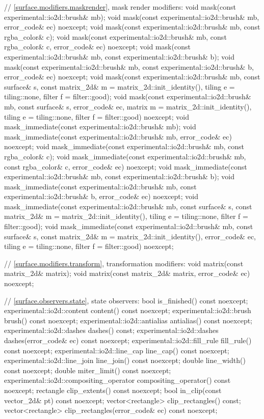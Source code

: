 \begin{codeblock}
{{{{{    // \ref{surface.modifiers.maskrender}, mask render modifiers:
    void mask(const experimental::io2d::brush& mb);
    void mask(const experimental::io2d::brush& mb, error_code& ec)
      noexcept;
    void mask(const experimental::io2d::brush& mb, const rgba_color& c);
    void mask(const experimental::io2d::brush& mb, const rgba_color& c, 
      error_code& ec) noexcept;
    void mask(const experimental::io2d::brush& mb,
      const experimental::io2d::brush& b);
    void mask(const experimental::io2d::brush& mb,
      const experimental::io2d::brush& b, error_code& ec) noexcept;
    void mask(const experimental::io2d::brush& mb, const surface& s,
      const matrix_2d& m = matrix_2d::init_identity(), tiling e = tiling::none, 
      filter f = filter::good);
    void mask(const experimental::io2d::brush& mb, const surface& s,
      error_code& ec, matrix m = matrix_2d::init_identity(),
      tiling e = tiling::none, filter f = filter::good) noexcept;
    void mask_immediate(const experimental::io2d::brush& mb);
    void mask_immediate(const experimental::io2d::brush& mb, error_code& ec)
      noexcept;
    void mask_immediate(const experimental::io2d::brush& mb,
      const rgba_color& c);
    void mask_immediate(const experimental::io2d::brush& mb,
      const rgba_color& c, error_code& ec) noexcept;
    void mask_immediate(const experimental::io2d::brush& mb,
      const experimental::io2d::brush& b);
    void mask_immediate(const experimental::io2d::brush& mb,
      const experimental::io2d::brush& b, error_code& ec) noexcept;
    void mask_immediate(const experimental::io2d::brush& mb, const surface& s, 
      const matrix_2d& m = matrix_2d::init_identity(), tiling e = tiling::none, 
      filter f = filter::good);
    void mask_immediate(const experimental::io2d::brush& mb, const surface& s,
      const matrix_2d& m = matrix_2d::init_identity(), error_code& ec,
      tiling e = tiling::none, filter f = filter::good) noexcept;
    
    // \ref{surface.modifiers.transform}, transformation modifiers:
    void matrix(const matrix_2d& matrix);
    void matrix(const matrix_2d& matrix, error_code& ec) noexcept;
    
    // \ref{surface.observers.state}, state observers:
    bool is_finished() const noexcept;
    experimental::io2d::content content() const noexcept;
    experimental::io2d::brush brush() const noexcept;
    experimental::io2d::antialias antialias() const noexcept;
    experimental::io2d::dashes dashes() const;
    experimental::io2d::dashes dashes(error_code& ec) const noexcept;
    experimental::io2d::fill_rule fill_rule() const noexcept;
    experimental::io2d::line_cap line_cap() const noexcept;
    experimental::io2d::line_join line_join() const noexcept;
    double line_width() const noexcept;
    double miter_limit() const noexcept;
    experimental::io2d::compositing_operator compositing_operator() const
      noexcept;
    rectangle clip_extents() const noexcept;
    bool in_clip(const vector_2d& pt) const noexcept;
    vector<rectangle> clip_rectangles() const;
    vector<rectangle> clip_rectangles(error_code& ec) const noexcept;
    
}}}}}
\end{codeblock}
